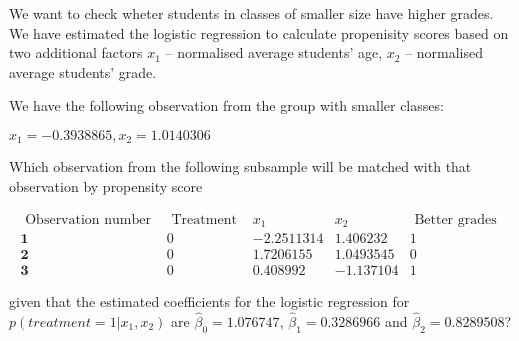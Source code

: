 
\begin{question}
We want to check wheter students in classes of smaller size have higher grades. We have estimated the logistic regression to calculate propenisity scores based on two additional factors \(x_1\) -- normalised average students' age, \(x_2\) -- normalised average students' grade.

We have the following observation from the group with smaller classes:

\(x_1=-0.3938865, x_2=1.0140306\)

Which observation from the following subsample will be matched with that observation by propensity score

\[
\begin{array}{rrrrr} 
 \text { Observation number }&  \text { Treatment } &  x_1  &  x_2  & \text { Better grades } \\
\hline 
 \mathbf{1} & 0 & -2.2511314 & 1.406232 & 1 \\
 \mathbf{2} & 0 & 1.7206155 & 1.0493545  & 0 \\
 \mathbf{3} & 0 &  0.408992  & -1.137104   & 1
\end{array}
\]

given that the estimated coefficients for the logistic regression for \(p(treatment=1|x_1,x_2)\) are \(\hat{\beta}_0 = 1.076747\), \(\hat{\beta}_1 = 0.3286966\) and \(\hat{\beta}_2 = 0.8289508\)?
\end{question}



